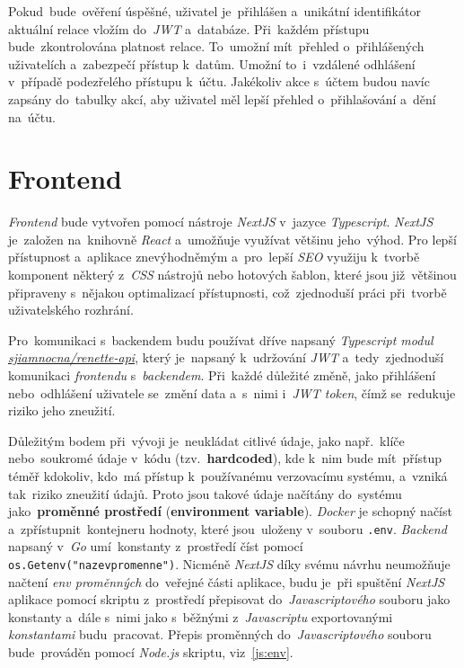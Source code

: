 \documentclass[11pt,a4paper]{report}
\begin{document}
            Pokud~bude~ověření úspěšné, uživatel je~přihlášen a~unikátní identifikátor aktuální relace vložím do~\emph{JWT} a~databáze. Při~každém přístupu bude~zkontrolována platnost relace. To~umožní mít~přehled o~přihlášených uživatelích a~zabezpečí přístup k~datům. Umožní to~i~vzdálené odhlášení v~případě podezřelého přístupu k~účtu. Jakékoliv akce s~účtem budou navíc zapsány do~tabulky akcí, aby uživatel měl lepší přehled o~přihlašování a~dění na~účtu.

        \section{Frontend}
            \emph{Frontend} bude vytvořen pomocí nástroje \emph{NextJS} v~jazyce \emph{Typescript}. \emph{NextJS} je~založen na~knihovně \emph{React} a~umožňuje využívat většinu jeho~výhod. Pro lepší přístupnost a~aplikace znevýhodněmým a~pro~lepší \emph{SEO} využiju k~tvorbě komponent některý z~\emph{CSS} nástrojů nebo hotových šablon, které jsou již~většinou připraveny s~nějakou optimalizací přístupnosti, což~zjednoduší práci při~tvorbě uživatelského rozhrání.

            Pro~komunikaci s~backendem budu používat dříve napsaný \emph{Typescript modul} \href{https://gitlab.com/sjiamnocna/renette-api}{\emph{sjiamnocna/renette-api}}, který je~napsaný k~udržování \emph{JWT} a~tedy~zjednoduší komunikaci \emph{frontendu} s~\emph{backendem}. Při~každé důležité změně, jako přihlášení nebo~odhlášení uživatele se~změní data a~s~nimi i~\emph{JWT token}, čímž se~redukuje riziko jeho zneužití.

            Důležitým bodem při~vývoji je~neukládat citlivé údaje, jako např.~klíče nebo~soukromé údaje v~kódu (tzv.~\textbf{hardcoded}), kde k~nim bude mít~přístup téměř kdokoliv, kdo~má přístup k~používanému verzovacímu systému, a~vzniká tak~riziko zneužití údajů. Proto jsou takové údaje načítány do~systému jako~\textbf{proměnné prostředí} (\textbf{environment variable}). \emph{Docker} je schopný načíst a~zpřístupnit~kontejneru hodnoty, které jsou~uloženy v~souboru \texttt{.env}. \emph{Backend} napsaný v~\emph{Go} umí~konstanty z~prostředí číst pomocí \texttt{os.Getenv("nazevpromenne")}. Nicméně \emph{NextJS} díky svému návrhu neumožňuje načtení \emph{env proměnných} do~veřejné části aplikace, budu je~při spuštění \emph{NextJS} aplikace pomocí skriptu z~prostředí přepisovat do~\emph{Javascriptového} souboru jako konstanty a~dále s~nimi jako s~běžnými z~\emph{Javascriptu} exportovanými \emph{konstantami} budu~pracovat. Přepis proměnných do~\emph{Javascriptového} souboru bude~prováděn pomocí \emph{Node.js} skriptu, viz~\ref{js:env}.
            
\end{document}
